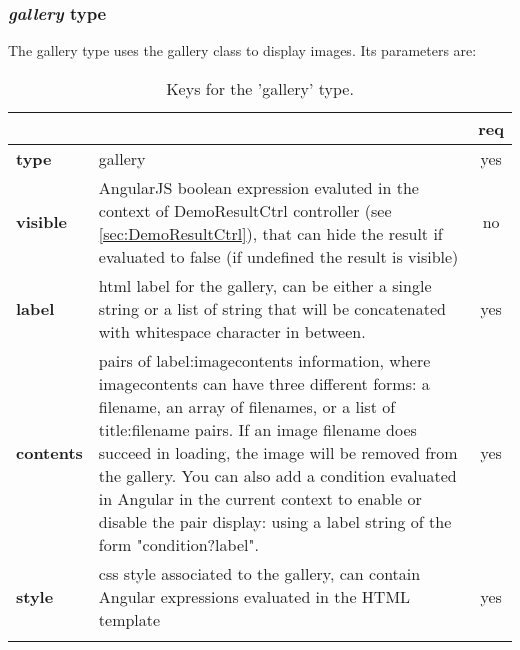 \subsubsection{ \emph{gallery} type}

The gallery type uses the gallery class to display images. Its parameters are:

\begin{longtable}{|>{\bf}L{\linewidth}|L{\linewidth}|c|}
\hline
      &  & {\bf req} 
\tabularnewline \hline \hline
 type       & gallery  & yes \\ \hline
 visible    & AngularJS boolean expression evaluted in the context of DemoResultCtrl
              controller (see \ref{sec:DemoResultCtrl}), that can hide the result if
              evaluated to false (if undefined the result is visible)& no \\ \hline
 label      & html label for the gallery, can be either a single string or 
             a list of string that will be concatenated with whitespace character
              in between. & yes \\ \hline
 contents   & pairs of label:imagecontents information, where imagecontents can 
              have three different forms: a filename, an array of filenames, or
              a list of title:filename pairs. 
              If an image filename does succeed in loading,
              the image will be removed from the gallery. 
              You can also add a condition evaluated in Angular
              in the current context to enable or disable the pair display:
              using a label string of the form "condition?label".
            & yes \\ \hline
 style      & css style associated to the gallery, can contain Angular 
              expressions evaluated in the HTML template & yes \\ \hline
\caption{Keys for the 'gallery' type.}
\end{longtable}

